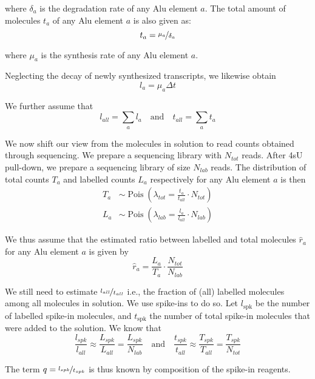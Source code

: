 \noindent where $\delta_{a}$ is the degradation rate of any Alu element $a$. The
total amount of molecules $t_{a}$ of any Alu element $a$ is also given as:
\begin{equation*}
t_{a}=\nicefrac{\mu_{a}}{\delta_{a}}
\end{equation*}

\noindent where $\mu_{a}$ is the synthesis rate of any Alu element $a$.

\noindent{}Neglecting the
decay of newly synthesized transcripts, we likewise obtain
\begin{equation*}
l_{a}=\mu_{a}\Delta t
\end{equation*}

\noindent We further assume that
\begin{equation*}
l_{all}=\sum_{a}l_{a}\quad\text{and}\quad t_{all}=\sum_{a}t_{a}
\end{equation*}

\noindent We now shift our view from the molecules in solution to read counts
obtained through sequencing. We prepare a sequencing library with $N_{tot}$
reads. After 4sU pull-down, we prepare a sequencing library of size $N_{lab}$
reads. The distribution of total counts $T_{a}$ and labelled counts $L_{a}$
respectively for any Alu element $a$ is then
\begin{align*}
  T_{a} &\sim \operatorname{Pois}
  (\lambda_{tot}=\frac{t_{a}}{t_{all}}\cdot N_{tot})
\\ L_{a} &\sim \operatorname{Pois}
  (\lambda_{lab}=\frac{l_{a}}{l_{all}}\cdot N_{lab})
\end{align*}

\noindent We thus assume that the estimated ratio between labelled and total
molecules $\hat{r}_{a}$ for any Alu element $a$ is given by
\begin{equation*}
\hat{r}_{a}=\frac{L_{a}}{T_{a}}\cdot\frac{N_{tot}}{N_{lab}}
\end{equation*}

\noindent We still need to estimate $\nicefrac{l_{all}}{t_{all}}$ i.e., the
fraction of (all) labelled molecules among all molecules in solution. We use
spike-ins to do so. Let $l_{\text{spk}}$ be the number of labelled spike-in
molecules, and $t_{\text{spk}}$ the number of total spike-in molecules that were
added to the solution. We know that
\begin{equation}
\frac{l_{spk}}{l_{all}}\approx\frac{L_{spk}}{L_{all}}=\frac{L_{spk}}{N_{lab}}
\quad\text{and}\quad
\frac{t_{spk}}{t_{all}}\approx\frac{T_{spk}}{T_{all}}=\frac{T_{spk}}{N_{tot}}
\label{spk}
\end{equation}

\noindent The term $q=\nicefrac{l_{spk}}{t_{spk}}$ is thus known by composition
of the spike-in reagents.